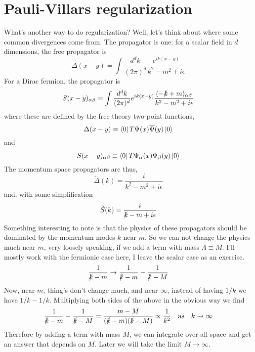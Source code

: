 \documentclass[main.tex]{subfiles}
\begin{document}
\section{Pauli-Villars regularization}
What's another way to do regularization? Well, let's think about where some common divergences come from. The propagator is one: for a scalar field in $d$ dimensions, the free propagator is 
\[
\Delta(x-y) = \int \frac{d^d k}{(2\pi)^d} \frac{e^{ik(x-y)}}{k^2 - m^2 + i\epsilon}
\]
For a Dirac fermion, the propagator is 
\[
S(x-y)_{\alpha \beta} = \int \frac{d^d k}{(2\pi)^d} e^{ik(x-y)} \frac{(-\slashed{k} + m )_{\alpha \beta}}{k^2 - m^2 + i \epsilon}
\]
where these are defined by the free theory two-point functions,
\[
\Delta(x-y) \equiv  \bra{0} T \Psi(x) \overline{\Psi} (y) \ket{0}
\]
and
\[
S(x-y)_{\alpha \beta} \equiv \bra{0} T \Psi_\alpha (x) \overline{\Psi}_\beta (y) \ket{0}
\]
The momentum space propagators are thus, 
\[
\tilde{\Delta}(k) = \frac{i}{k^2 - m^2 + i\epsilon}
\]
and, with some simplification
\[
\tilde{S} (k) = \frac{i}{\slashed{k} - m + i\epsilon}
\]
Something interesting to note is that the physics of these propagators should be dominated by the momentum modes $k$ near $m$. So we can not change the physics much near $m$, very loosely speaking, if we add a term with mass $\Lambda \equiv M$. I'll mostly work with the fermionic case here, I leave the scalar case as an exercise.
\[
\frac{1}{\slashed{k}-m} \to \frac{1}{\slashed{k} - m} - \frac{1}{\slashed{k} - M}
\] 
Now, near $m$, thing's don't change much, and near $\infty$, instead of having $1/k$ we have $1/k - 1/k$. Multiplying both sides of the above in the obvious way we find
\[
\frac{1}{\slashed{k} - m} - \frac{1}{\slashed{k} -M} = \frac{m - M}{(\slashed{k} - m)(\slashed{k} - M)} \propto \frac{1}{k^2} \quad \text{as} \quad k \to \infty
\]
Therefore by adding a term with mass $M$, we can integrate over all space and get an answer that depends on $M$. Later we will take the limit $M \to \infty$.
\end{document}
